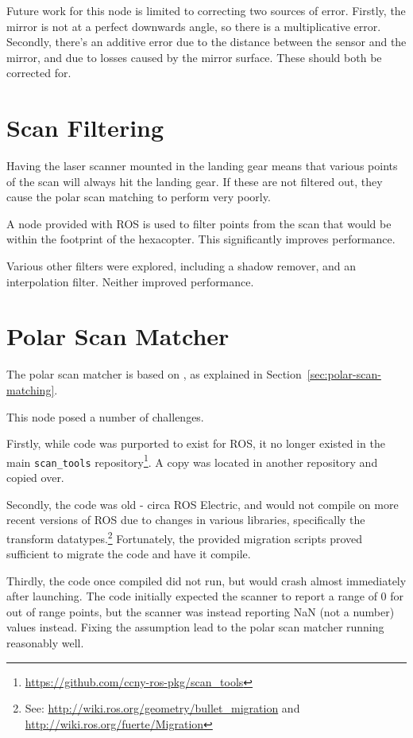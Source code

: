 \documentclass[12pt,oneside,a4paper]{book}
\begin{document}
Future work for this node is limited to correcting two sources of
error.  Firstly, the mirror is not at a perfect downwards angle, so
there is a multiplicative error. Secondly, there's an additive error
due to the distance between the sensor and the mirror, and due to
losses caused by the mirror surface. These should both be corrected
for.

\section{Scan Filtering}
\label{sec:scan-filtering}

Having the laser scanner mounted in the landing gear means that
various points of the scan will always hit the landing gear. If these
are not filtered out, they cause the polar scan matching to perform
very poorly.

A node provided with ROS is used to filter points from the scan that
would be within the footprint of the hexacopter. This significantly
improves performance.

Various other filters were explored, including a shadow remover, and
an interpolation filter. Neither improved performance.

\section{Polar Scan Matcher}
\label{sec:polar-scan-matcher}

The polar scan matcher is based on \cite{polarscanmatching}, as
explained in Section~\ref{sec:polar-scan-matching}.

This node posed a number of challenges.

Firstly, while code was purported to exist for ROS, it no longer
existed in the main \texttt{scan\_tools}
repository\footnote{\url{https://github.com/ccny-ros-pkg/scan_tools}}. A
copy was located in another repository and copied over.

Secondly, the code was old - circa ROS Electric, and would not compile
on more recent versions of ROS due to changes in various libraries,
specifically the transform datatypes.\footnote{See:
  \url{http://wiki.ros.org/geometry/bullet_migration} and
  \url{http://wiki.ros.org/fuerte/Migration}} Fortunately, the
provided migration scripts proved sufficient to migrate the code and
have it compile.

Thirdly, the code once compiled did not run, but would crash almost
immediately after launching. The code initially expected the scanner
to report a range of 0 for out of range points, but the scanner was
instead reporting NaN (not a number) values instead. Fixing the
assumption lead to the polar scan matcher running reasonably well.
\end{document}
